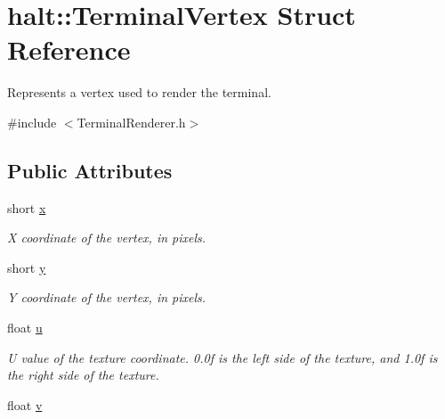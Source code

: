 \hypertarget{structhalt_1_1_terminal_vertex}{\section{halt\-:\-:\-Terminal\-Vertex \-Struct \-Reference}
\label{structhalt_1_1_terminal_vertex}
}


\-Represents a vertex used to render the terminal.  




{\ttfamily \#include $<$\-Terminal\-Renderer.\-h$>$}

\subsection*{\-Public \-Attributes}
\begin{DoxyCompactItemize}
\item 
\hypertarget{structhalt_1_1_terminal_vertex_aabc141a869b123bb1e65b0104aad2fae}{short \hyperlink{structhalt_1_1_terminal_vertex_aabc141a869b123bb1e65b0104aad2fae}{x}}\label{structhalt_1_1_terminal_vertex_aabc141a869b123bb1e65b0104aad2fae}

\begin{DoxyCompactList}\small\item\em \-X coordinate of the vertex, in pixels. \end{DoxyCompactList}\item 
\hypertarget{structhalt_1_1_terminal_vertex_aeac4e5413ae61093370e3ed51480c5e9}{short \hyperlink{structhalt_1_1_terminal_vertex_aeac4e5413ae61093370e3ed51480c5e9}{y}}\label{structhalt_1_1_terminal_vertex_aeac4e5413ae61093370e3ed51480c5e9}

\begin{DoxyCompactList}\small\item\em \-Y coordinate of the vertex, in pixels. \end{DoxyCompactList}\item 
\hypertarget{structhalt_1_1_terminal_vertex_acdab5898d75dfebf2258996c4f9e36fb}{float \hyperlink{structhalt_1_1_terminal_vertex_acdab5898d75dfebf2258996c4f9e36fb}{u}}\label{structhalt_1_1_terminal_vertex_acdab5898d75dfebf2258996c4f9e36fb}

\begin{DoxyCompactList}\small\item\em \-U value of the texture coordinate. 0.\-0f is the left side of the texture, and 1.\-0f is the right side of the texture. \end{DoxyCompactList}\item 
\hypertarget{structhalt_1_1_terminal_vertex_a7c84df1a3bce38f7fa95c04a3f3f1474}{float \hyperlink{structhalt_1_1_terminal_vertex_a7c84df1a3bce38f7fa95c04a3f3f1474}{v}}\label{structhalt_1_1_terminal_vertex_a7c84df1a3bce38f7fa95c04a3f3f1474}


\end{DoxyCompactItemize}
